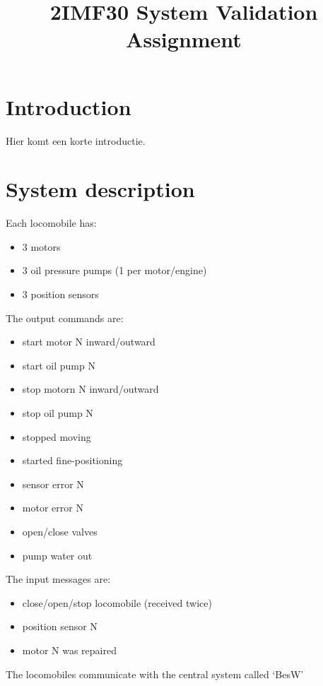 \documentclass{article}
\title{2IMF30 System Validation Assignment}
\begin{document}
\section{Introduction}
Hier komt een korte introductie.

\section{System description}
Each locomobile has:
\begin{itemize}
    \item 3 motors
    \item 3 oil pressure pumps (1 per motor/engine)
    \item 3 position sensors
\end{itemize}
The output commands are:
\begin{itemize}
    \item start motor N inward/outward
    \item start oil pump N
    \item stop motorn N inward/outward
    \item stop oil pump N

    \item stopped moving
    \item started fine-positioning
    \item sensor error N
    \item motor error N

    \item open/close valves
    \item pump water out
\end{itemize}
The input messages are:
\begin{itemize}
    \item close/open/stop locomobile (received twice)
    \item position sensor N
    \item motor N was repaired
\end{itemize}
The locomobiles communicate with the central system called `BesW'
\end{document}
